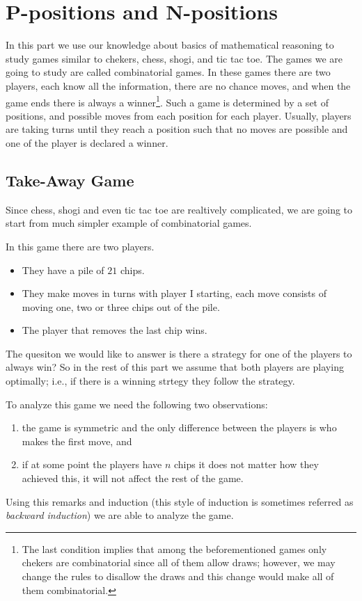 \chapter{P-positions and N-positions}
In this part we use our knowledge about basics of mathematical reasoning
to study games similar to chekers, chess, shogi, and tic tac toe. The games we
are going to study are called combinatorial games. In these games there are two
players, each know all the information, there are no chance moves, and when the
game ends there is always a winner\footnote{%
  The last condition implies that among the beforementioned games only chekers
  are combinatorial since all of them allow draws; however, we may change the
  rules to disallow the draws and this change would make all of them
  combinatorial.
}. Such a game is determined by a set of positions, and possible moves
from each position for each player. Usually, players are taking turns until
they reach a position such that no moves are possible and one of the player is
declared a winner.

\section{Take-Away Game}

Since chess, shogi and even tic tac toe are realtively complicated,
we are going to start from much simpler example of combinatorial games.
\begin{game}
\label{game:take-away-21-3-2-1}
  In this game there are two players.
  \begin{itemize}
    \item They have a pile of $21$ chips.
    \item They make moves in turns with player I starting,
      each move consists of moving one, two or three chips out of the pile.
    \item The player that removes the last chip wins.
  \end{itemize}
\end{game}
The quesiton we would like to answer is there a strategy for one of the players
to always win? So in the rest of this part we assume that both players are
playing optimally; i.e., if there is a winning strtegy they follow the strategy.

To analyze this game we need the following two observations:
\begin{enumerate}
  \item the game is symmetric and the only difference between the players is
    who makes the first move, and
  \item if at some point the players have $n$ chips it does not matter how they
    achieved this, it will not affect the rest of the game.
\end{enumerate}
Using this remarks and induction (this style of induction is sometimes
referred as \emph{backward induction}) we are able to analyze the game.

